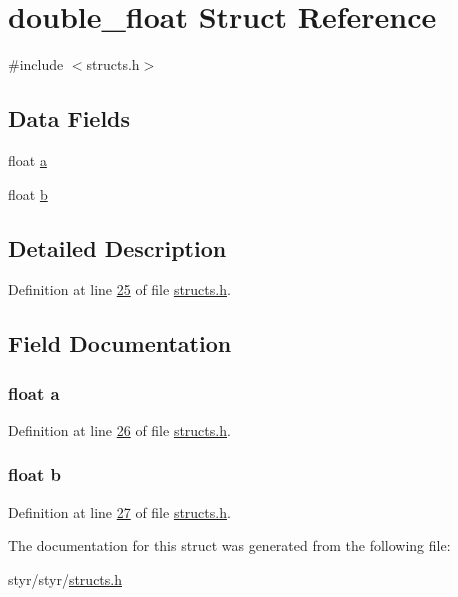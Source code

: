 \hypertarget{structdouble__float}{}\section{double\+\_\+float Struct Reference}
\label{structdouble__float}


{\ttfamily \#include $<$structs.\+h$>$}

\subsection*{Data Fields}
\begin{DoxyCompactItemize}
\item 
float \hyperlink{structdouble__float_a4aec1a5be9d9a4a394a2e49e9744286e}{a}
\item 
float \hyperlink{structdouble__float_a83fc1af92e29717b4513d121b0c72c7d}{b}
\end{DoxyCompactItemize}


\subsection{Detailed Description}


Definition at line \hyperlink{structs_8h_source_l00025}{25} of file \hyperlink{structs_8h_source}{structs.\+h}.



\subsection{Field Documentation}
\subsubsection[{\texorpdfstring{a}{a}}]{\setlength{\rightskip}{0pt plus 5cm}float a}\hypertarget{structdouble__float_a4aec1a5be9d9a4a394a2e49e9744286e}{}\label{structdouble__float_a4aec1a5be9d9a4a394a2e49e9744286e}


Definition at line \hyperlink{structs_8h_source_l00026}{26} of file \hyperlink{structs_8h_source}{structs.\+h}.

\subsubsection[{\texorpdfstring{b}{b}}]{\setlength{\rightskip}{0pt plus 5cm}float b}\hypertarget{structdouble__float_a83fc1af92e29717b4513d121b0c72c7d}{}\label{structdouble__float_a83fc1af92e29717b4513d121b0c72c7d}


Definition at line \hyperlink{structs_8h_source_l00027}{27} of file \hyperlink{structs_8h_source}{structs.\+h}.



The documentation for this struct was generated from the following file\+:\begin{DoxyCompactItemize}
\item 
styr/styr/\hyperlink{structs_8h}{structs.\+h}\end{DoxyCompactItemize}
